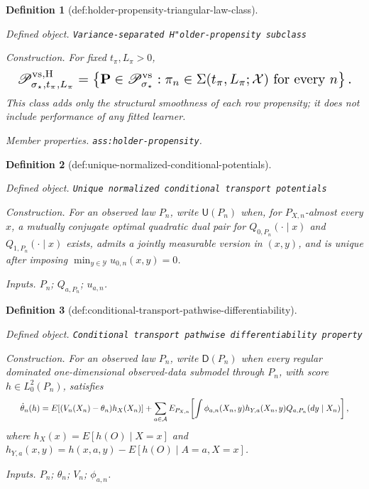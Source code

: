 \documentclass{article}
\newtheorem{definition}{Definition}
\begin{document}
\begin{definition}[def:holder-propensity-triangular-law-class]\label{def:holder-propensity-triangular-law-class}
\par\smallskip\noindent\emph{Defined object.} \texttt{Variance-\allowbreak{}separated H"older-\allowbreak{}propensity subclass}
\par\smallskip\noindent\emph{Construction.} For fixed \(t_\pi,L_\pi>0\),
\[
\makebox[\linewidth][c]{\resizebox{0.98\linewidth}{!}{\(\displaystyle \mathscr P^{\mathrm{vs,H}}_{\sigma_\star,t_\pi,L_\pi}
=\left\{\mathbf P\in\mathscr P^{\mathrm{vs}}_{\sigma_\star}:\pi_n\in\Sigma(t_\pi,L_\pi;\mathcal X)\text{ for every }n\right\}.\)}}
\]
This class adds only the structural smoothness of each row propensity; it does not include performance of any fitted learner.
\par\smallskip\noindent\emph{Member properties.} \texttt{ass:\allowbreak{}holder-\allowbreak{}propensity}.
\end{definition}

\begin{definition}[def:unique-normalized-conditional-potentials]\label{def:unique-normalized-conditional-potentials}
\par\smallskip\noindent\emph{Defined object.} \texttt{Unique normalized conditional transport potentials}
\par\smallskip\noindent\emph{Construction.} For an observed law \(P_n\), write \(\mathsf U(P_n)\) when, for \(P_{X,n}\)-almost every \(x\), a mutually conjugate optimal quadratic dual pair for \(Q_{0,P_n}(\cdot\mid x)\) and \(Q_{1,P_n}(\cdot\mid x)\) exists, admits a jointly measurable version in \((x,y)\), and is unique after imposing \(\min_{y\in\mathcal Y}u_{0,n}(x,y)=0\).
\par\smallskip\noindent\emph{Inputs.} \(P_n\); \(Q_{a,P_n}\); \(u_{a,n}\).
\end{definition}

\begin{definition}[def:conditional-transport-pathwise-differentiability]\label{def:conditional-transport-pathwise-differentiability}
\par\smallskip\noindent\emph{Defined object.} \texttt{Conditional transport pathwise differentiability property}
\par\smallskip\noindent\emph{Construction.} For an observed law \(P_n\), write \(\mathsf D(P_n)\) when every regular dominated one-dimensional observed-data submodel through \(P_n\), with score \(h\in L_0^2(P_n)\), satisfies
\[
\makebox[\linewidth][c]{\resizebox{0.98\linewidth}{!}{\par\noindent \makebox[\linewidth][c]{\resizebox{0.98\linewidth}{!}{\(\displaystyle \displaystyle \dot\theta_n(h)=E[(V_n(X_n)-\theta_n)h_X(X_n)]+\sum_{a\in\mathcal A}E_{P_{X,n}}\!\left[\int\phi_{a,n}(X_n,y)h_{Y,a}(X_n,y)Q_{a,P_n}(dy\mid X_n)\right],\)}}\par\noindent}}
\]
where \(h_X(x)=E[h(O)\mid X=x]\) and \(h_{Y,a}(x,y)=h(x,a,y)-E[h(O)\mid A=a,X=x]\).
\par\smallskip\noindent\emph{Inputs.} \(P_n\); \(\theta_n\); \(V_n\); \(\phi_{a,n}\).
\end{definition}
\end{document}
